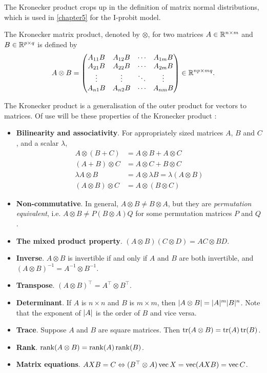 The Kronecker product crops up in the definition of matrix normal distributions, which is used in \cref{chapter5} for the I-probit model.

\begin{definition}\label{def:kroneckerprod}
  The Kronecker matrix product, denoted by $\otimes$, for two matrices $A \in \mathbb{R}^{n\times m}$ and $B \in \mathbb{R}^{p\times q}$ is defined by
  \[
    A \otimes B = 
    \begin{pmatrix}
      A_{11}B &A_{12}B &\cdots &A_{1m}B \\
      A_{21}B &A_{22}B &\cdots &A_{2m}B \\    
      \vdots & \vdots &\ddots  &\vdots \\
      A_{n1}B &A_{n2}B &\cdots &A_{nm}B \\
    \end{pmatrix} \in \mathbb{R}^{np\times mq}.
  \]
\end{definition}

The Kronecker product is a generalisation of the outer product for vectors to matrices.
Of use will be these properties of the Kronecker product \citep{zhang2013kronecker}:
\begin{itemize}
  \item \textbf{Bilinearity and associativity}. For appropriately sized matrices $A$, $B$ and $C$, and a scalar $\lambda$,
  \begin{align*}
    A \otimes (B + C) &= A \otimes B + A \otimes C \\
    (A + B) \otimes C &= A \otimes C + B \otimes C \\
    \lambda A \otimes B &= A \otimes \lambda B = \lambda(A \otimes B) \\
    (A \otimes B) \otimes C &= A \otimes (B \otimes C)
  \end{align*}
  \item \textbf{Non-commutative}. In general, $A \otimes B \neq B \otimes A$, but they are \emph{permutation equivalent}, i.e. $A \otimes B \neq P(B \otimes A)Q$ for some permutation matrices $P$ and $Q$.
  \item \textbf{The mixed product property}. $(A \otimes B)(C \otimes D) = AC \otimes BD$.
  \item \textbf{Inverse}. $A \otimes B$ is invertible if and only if $A$ and $B$ are both invertible, and $(A \otimes B)^{-1} = A^{-1} \otimes B^{-1}$.
  \item \textbf{Transpose}. $(A \otimes B)^\top = A^\top \otimes B^\top$.
  \item \textbf{Determinant}. If $A$ is $n\times n$ and $B$ is $m \times m$, then $\lvert A \otimes B\rvert = \lvert A\rvert^m \lvert B\rvert^n$. Note that the exponent of $\lvert A\rvert$ is the order of $B$ and vice versa.
  \item \textbf{Trace}. Suppose $A$ and $B$ are square matrices. Then $\operatorname{tr} (A \otimes B) = \operatorname{tr} (A) \operatorname{tr} (B)$.
  \item \textbf{Rank}. $\operatorname{rank} (A \otimes B) = \operatorname{rank} (A) \operatorname{rank} (B)$.
  \item \textbf{Matrix equations}. $AXB = C \Leftrightarrow (B^\top \otimes A) \operatorname{vec} X = \operatorname{vec} (AXB) = \operatorname{vec} C$.
\end{itemize}

